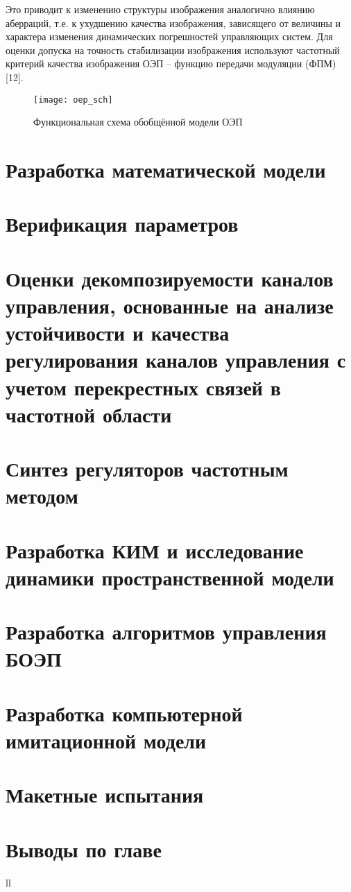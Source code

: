 Это приводит к изменению структуры изображения аналогично влиянию аберраций, т.е. к ухудшению качества изображения, зависящего от величины и характера изменения динамических погрешностей управляющих систем. Для оценки допуска на точность стабилизации изображения используют частотный критерий качества изображения ОЭП – функцию передачи модуляции (ФПМ) [12].

\begin{figure}[ht]
	\centering
	\texttt{[image: oep\_sch]} 
	\caption{Функциональная схема обобщённой модели ОЭП}
	\label{fig:oep_sch}
\end{figure}


\section{Разработка математической модели} \label{sec:ch2/sec3}

\section{Верификация параметров} \label{sec:ch2/sec4}

\section{Оценки декомпозируемости каналов управления, основанные на анализе устойчивости и качества регулирования каналов управления с учетом перекрестных связей в частотной области} \label{sec:ch2/sec5}

\section{Синтез регуляторов частотным методом} \label{sec:ch2/sec6}

\section{Разработка КИМ и исследование динамики пространственной модели} \label{sec:ch2/sec7}

\section{Разработка алгоритмов управления БОЭП} \label{sec:ch2/sec8}

\section{Разработка компьютерной имитационной модели} \label{sec:ch2/sec9}

\section{Макетные испытания} \label{sec:ch2/sec10}

\section{Выводы по главе} \label{sec:ch2/sec11}



ll

